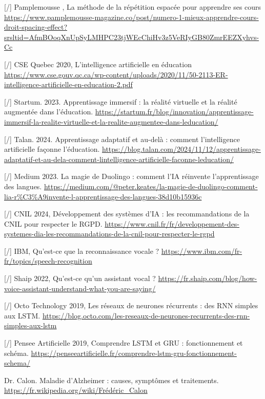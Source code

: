 \documentclass[11pt,a4paper]{report}
\begin{document}
\begin{thebibliography}{9}
        [/] Pamplemousse , La méthode de la répétition espacée pour apprendre ses cours \break
        \url{https://www.pamplemousse-magazine.co/post/numero-1-mieux-apprendre-cours-droit-spacing-effect?srsltid=AfmBOoqXnUpSyLMHPC23tjWEcChiHv3z5VeRIyGB80ZmrEEZXyhvs-Cc}
    
        [/] CSE Quebec 2020, L’intelligence artificielle en éducation
        \url{https://www.cse.gouv.qc.ca/wp-content/uploads/2020/11/50-2113-ER-intelligence-artificielle-en-education-2.pdf}
    
        [/] Startum. 2023. Apprentissage immersif : la réalité virtuelle et la réalité augmentée dans l'éducation. \break
        \url{https://startum.fr/blog/innovation/apprentissage-immersif-la-realite-virtuelle-et-la-realite-augmentee-dans-leducation/}
    
        [/] Talan. 2024. Apprentissage adaptatif et au-delà : comment l'intelligence artificielle façonne l'éducation. \break
        \url{https://blog.talan.com/2024/11/12/apprentissage-adaptatif-et-au-dela-comment-lintelligence-artificielle-faconne-leducation/}
    
        [/] Medium 2023. La magie de Duolingo : comment l'IA réinvente l'apprentissage des langues. \break
        \url{https://medium.com/@peter.keates/la-magie-de-duolingo-comment-lia-r%C3%A9invente-l-apprentissage-des-langues-38d10b15936c}

        [/] CNIL 2024, Développement des systèmes d’IA : les recommandations de la CNIL pour respecter le RGPD. \break
        \url{https://www.cnil.fr/fr/developpement-des-systemes-dia-les-recommandations-de-la-cnil-pour-respecter-le-rgpd}
    
        [/] IBM, Qu’est-ce que la reconnaissance vocale ? \break
        \url{https://www.ibm.com/fr-fr/topics/speech-recognition}
    
        [/] Shaip 2022, Qu'est-ce qu'un assistant vocal ? \break
        \url{https://fr.shaip.com/blog/how-voice-assistant-understand-what-you-are-saying/}
    
        [/] Octo Technology 2019, Les réseaux de neurones récurrents : des RNN simples aux LSTM. \break
        \url{https://blog.octo.com/les-reseaux-de-neurones-recurrents-des-rnn-simples-aux-lstm}
    
        [/] Pensee Artificielle 2019, Comprendre LSTM et GRU : fonctionnement et schéma. \break
        \url{https://penseeartificielle.fr/comprendre-lstm-gru-fonctionnement-schema/}

        Dr. Calon. Maladie d'Alzheimer : causes, symptômes et traitements. \break
        \url{https://fr.wikipedia.org/wiki/Frédéric_Calon}

\end{thebibliography}
\end{document}
